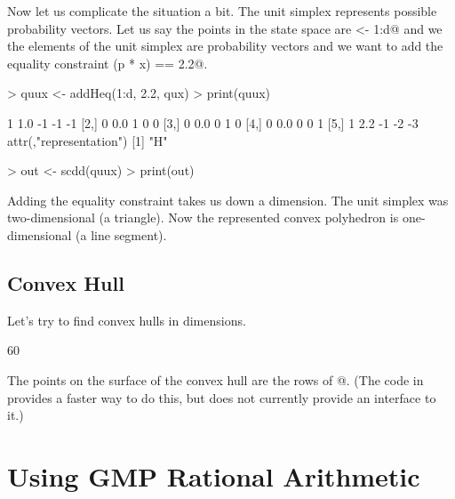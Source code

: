 \documentclass{article}
\begin{document}
Now let us complicate the situation a bit.  The unit simplex represents
possible probability vectors.  Let us say the points in the state space
are \verb@x <- 1:d@ and we the elements of the unit simplex are probability
vectors \verb@p@ and we want to add the equality constraint
\verb@sum(p * x) == 2.2@.
\begin{Schunk}
\begin{Sinput}
> quux <- addHeq(1:d, 2.2, qux)
> print(quux)
\end{Sinput}
\begin{Soutput}
     [,1] [,2] [,3] [,4] [,5]
[1,]    1  1.0   -1   -1   -1
[2,]    0  0.0    1    0    0
[3,]    0  0.0    0    1    0
[4,]    0  0.0    0    0    1
[5,]    1  2.2   -1   -2   -3
attr(,"representation")
[1] "H"
\end{Soutput}
\begin{Sinput}
> out <- scdd(quux)
> print(out)
\end{Sinput}
\end{Schunk}
Adding the equality constraint takes us down a dimension.  The unit
simplex was two-dimensional (a triangle).  Now the represented convex
polyhedron is one-dimensional (a line segment).

\subsection{Convex Hull}

Let's try to find convex hulls in \verb@d@ dimensions.
\begin{Schunk}
\begin{Soutput}
[1] 60
\end{Soutput}
\end{Schunk}
The points on the surface of the convex hull are the rows
of \verb@x[! inies, ]@.
(The code in \verb@cddlib@ provides a faster way to do this, but \verb@rcdd@
does not currently provide an interface to it.)

\section{Using GMP Rational Arithmetic} \label{sec:gmp}
\end{document}
